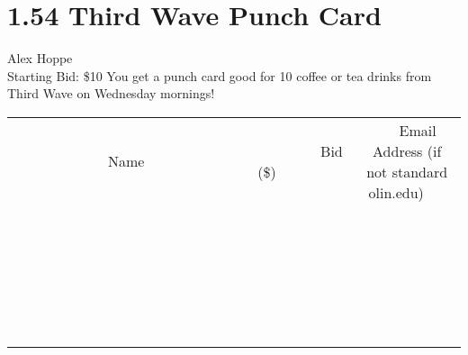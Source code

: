 \documentclass[11pt]{article}
\begin{document}
\section*{1.54 Third Wave Punch Card}
Alex Hoppe
\\
Starting Bid: \$10
\newline
You get a punch card good for 10 coffee or tea drinks from Third Wave on Wednesday mornings!
\\[6ex]
\begin{tabular}{c c c}
~~~~~~~~~~~~~Name~~~~~~~~~~~~~ & ~~~~~~~~~Bid (\$)~~~~~~~~~  & ~~~Email Address (if not standard olin.edu)~~~\\
 & & \\
\hline
 & & \\
\hline
 & & \\
\hline
 & & \\
\hline
 & & \\
\hline
 & & \\
\hline
 & & \\
\hline
 & & \\
\hline
 & & \\
\hline
 & & \\
\hline
 & & \\
\hline
 & & \\
\hline
 & & \\
\hline
 & & \\
\hline
 & & \\
\hline
 & & \\
\hline
 & & \\
\hline
 & & \\
\hline
 & & \\
\hline
 & & \\
\hline
 & & \\
\hline
 & & \\
\hline
 & & \\
\hline
 & & \\
\hline
 & & \\
\hline
 & & \\
\hline
\end{tabular}
\newpage
\end{document}

